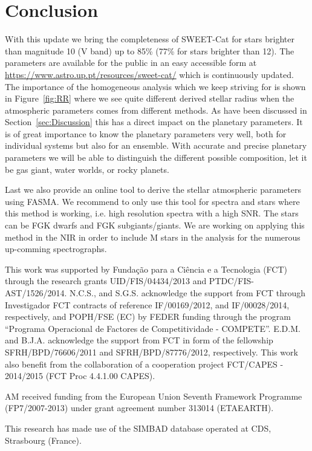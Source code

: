 \documentclass{aa}
\begin{document}
\section{Conclusion}
\label{sec:conclusion}

With this update we bring the completeness of SWEET-Cat for stars brighter than
magnitude 10 (V band) up to 85\% (77\% for stars brighter than 12). The
parameters are available for the public in an easy accessible form at
\url{https://www.astro.up.pt/resources/sweet-cat/} which is continuously
updated. The importance of the homogeneous analysis which we keep striving for
is shown in Figure~\ref{fig:RR} where we see quite different derived stellar
radius when the atmospheric parameters comes from different methods. As have
been discussed in Section~\ref{sec:Discussion} this has a direct impact on the
planetary parameters. It is of great importance to know the planetary parameters
very well, both for individual systems but also for an ensemble. With accurate
and precise planetary parameters we will be able to distinguish the different
possible composition, let it be gas giant, water worlds, or rocky planets.

Last we also provide an online tool to derive the stellar atmospheric parameters
using FASMA. We recommend to only use this tool for spectra and stars where this
method is working, i.e. high resolution spectra with a high SNR. The stars can
be FGK dwarfs and FGK subgiants/giants. We are working on applying this method
in the NIR in order to include M stars in the analysis for the numerous
up-comming spectrographs.



\begin{acknowledgements}

This work was supported by Funda\c{c}\~ao para a Ci\^encia e a Tecnologia (FCT)
through the research grants UID/FIS/04434/2013 and PTDC/FIS-AST/1526/2014.
N.C.S., and S.G.S. acknowledge the support from FCT through Investigador FCT
contracts of reference IF/00169/2012, and IF/00028/2014, respectively, and
POPH/FSE (EC) by FEDER funding through the program “Programa Operacional de
Factores de Competitividade - COMPETE”. E.D.M. and B.J.A. acknowledge the
support from FCT in form of the fellowship SFRH/BPD/76606/2011 and
SFRH/BPD/87776/2012, respectively. This work also benefit from the collaboration
of a cooperation project FCT/CAPES - 2014/2015 (FCT Proc 4.4.1.00 CAPES).

AM received funding from the European Union Seventh Framework Programme
(FP7/2007-2013) under grant agreement number 313014 (ETAEARTH).

This research has made use of the SIMBAD database operated at CDS, Strasbourg
(France).

\end{acknowledgements}
\end{document}
